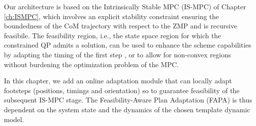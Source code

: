 


Our architecture is based on the Intrinsically Stable MPC (IS-MPC) of Chapter \ref{ch:ISMPC}, which involves an explicit stability constraint ensuring the boundedness of the CoM trajectory with respect to the ZMP and is recursive feasibile. 
The feasibility region, i.e., the state space region for which the constrained QP admits a solution, can be used to enhance the scheme capabilities by adapting the timing of the first step \cite{Smaldone2021FeasibilityDrivenSTA}, or to allow for non-convex regions \cite{Habib2022HandlingNonConvex} without burdening the optimization problem of the MPC.

In this chapter, we add an online adaptation module that can locally adapt footsteps (positions, timings and orientation) so to guarantee feasibility of the subsequent IS-MPC stage. The Feasibility-Aware Plan Adaptation (FAPA) is thus dependent on the system state and the dynamics of the chosen template dynamic model.



